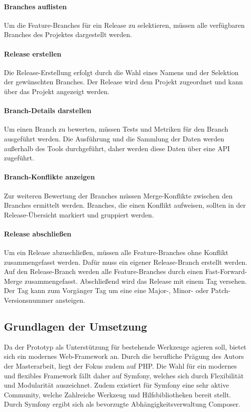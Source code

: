 \paragraph{Branches auflisten}
Um die Feature-Branches für ein Release zu selektieren, müssen alle verfügbaren Branches des Projektes dargestellt werden. 

\paragraph{Release erstellen}
Die Release-Erstellung erfolgt durch die Wahl eines Namens und der Selektion der gewünschten Branches. Der Release wird dem Projekt zugeordnet und kann über das Projekt angezeigt werden.

\paragraph{Branch-Details darstellen}
Um einen Branch zu bewerten, müssen Tests und Metriken für den Branch ausgeführt werden. Die Ausführung und die Sammlung der Daten werden außerhalb des Tools durchgeführt, daher werden diese Daten über eine API zugeführt.

\paragraph{Branch-Konflikte anzeigen}
Zur weiteren Bewertung der Branches müssen Merge-Konflikte zwischen den Branches ermittelt werden. Branches, die einen Konflikt aufweisen, sollten in der Release-Übersicht markiert und gruppiert werden.

\paragraph{Release abschließen}
Um ein Release abzuschließen, müssen alle Feature-Branches ohne Konflikt zusammengefasst werden. Dafür muss ein eigener Release-Branch erstellt werden. Auf den Release-Branch werden alle Feature-Branches durch einen Fast-Forward-Merge zusammengefasst. Abschließend wird das Release mit einem Tag versehen. Der Tag kann zum Vorgänger Tag um eine eine Major\hyp{}, Minor\hyp{} oder Patch\hyp{}Versionsnummer ansteigen.

\subsection{Grundlagen der Umsetzung}

Da der Prototyp als Unterstützung für bestehende Werkzeuge agieren soll, bietet sich ein modernes Web-Framework an. Durch die berufliche Prägung des Autors der Masterarbeit, liegt der Fokus zudem auf PHP. Die Wahl für ein modernes und flexibles Framework fällt daher auf Symfony, welches sich durch Flexibilität und Modularität auszeichnet. Zudem existiert für Symfony eine sehr aktive Community, welche Zahlreiche Werkzeug und Hilfsbibliotheken bereit stellt. Durch Symfony ergibt sich als bevorzugte Abhängigkeitsverwaltung Composer.  

